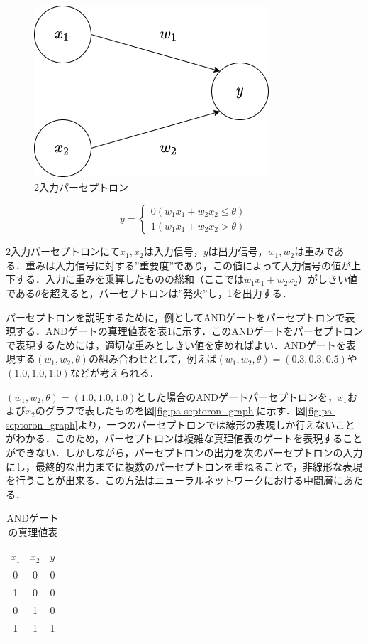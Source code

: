 \documentclass[a4j, 11pt]{jreport}
\begin{document}
\begin{figure}[H]
  \centering
  \includegraphics[width=0.50\hsize, keepaspectratio]{images/drawio/pa-seputoron.png}
  \caption{2入力パーセプトロン}
  \label{fig:pa-septoron}
 \end{figure}

\begin{equation}
y= \left \{
\begin{array}{l}
0　(w_1x_1 + w_2x_2 \leq \theta)\\
1　(w_1x_1 + w_2x_2 > \theta)
\end{array}
\right.
\label{eq:pa-septoron}
\end{equation}

2入力パーセプトロンにて$x_1, x_2$は入力信号，$y$は出力信号，$w_1, w_2$は重みである．重みは入力信号に対する''重要度''であり，この値によって入力信号の値が上下する．入力に重みを乗算したものの総和（ここでは$w_1x_1 + w_2x_2$）がしきい値である$\theta$を超えると，パーセプトロンは''発火''し，1を出力する．

パーセプトロンを説明するために，例としてANDゲートをパーセプトロンで表現する．ANDゲートの真理値表を表\ref{tb:and_gate}に示す．このANDゲートをパーセプトロンで表現するためには，適切な重みとしきい値を定めればよい．ANDゲートを表現する$(w_1, w_2, \theta)$の組み合わせとして，例えば$(w_1, w_2, \theta) = (0.3, 0.3, 0.5)$や$(1.0, 1.0, 1.0)$などが考えられる．

$(w_1, w_2, \theta) = (1.0, 1.0, 1.0)$とした場合のANDゲートパーセプトロンを，$x_1$および$x_2$のグラフで表したものを図\ref{fig:pa-septoron_graph}に示す．図\ref{fig:pa-septoron_graph}より，一つのパーセプトロンでは線形の表現しか行えないことがわかる．このため，パーセプトロンは複雑な真理値表のゲートを表現することができない．しかしながら，パーセプトロンの出力を次のパーセプトロンの入力にし，最終的な出力までに複数のパーセプトロンを重ねることで，非線形な表現を行うことが出来る．この方法はニューラルネットワークにおける中間層にあたる．

\begin{table}[H]
  \centering
	\caption{ANDゲートの真理値表}
  \begin{tabular}{cc|c}
    $x_1$ & $x_2$ & $y$ \\ \hline
    0 & 0 & 0 \\ 
    1 & 0 & 0 \\
    0 & 1 & 0 \\
    1 & 1 & 1 \\
  \end{tabular}
  \label{tb:and_gate}
\end{table}
\end{document}
